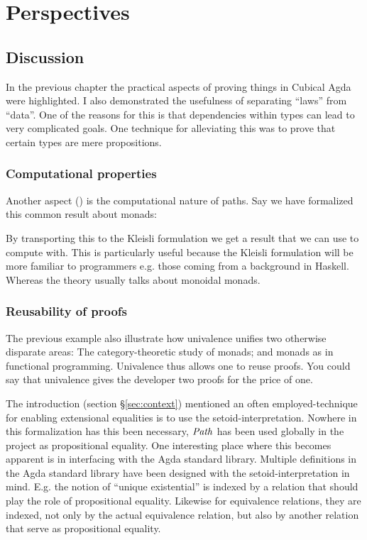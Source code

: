 \chapter{Perspectives}
\section{Discussion}
In the previous chapter the practical aspects of proving things in Cubical Agda
were highlighted. I also demonstrated the usefulness of separating ``laws'' from
``data''. One of the reasons for this is that dependencies within types can lead
to very complicated goals. One technique for alleviating this was to prove that
certain types are mere propositions.

\subsection{Computational properties}
Another aspect () is the computational nature of paths. Say we have formalized this
common result about monads:


By transporting this to the Kleisli formulation we get a result that we can use
to compute with. This is particularly useful because the Kleisli formulation
will be more familiar to programmers e.g. those coming from a background in
Haskell. Whereas the theory usually talks about monoidal monads.


\subsection{Reusability of proofs}
The previous example also illustrate how univalence unifies two otherwise
disparate areas: The category-theoretic study of monads; and monads as in
functional programming. Univalence thus allows one to reuse proofs. You could
say that univalence gives the developer two proofs for the price of one.

The introduction (section \S\ref{sec:context}) mentioned an often
employed-technique for enabling extensional equalities is to use the
setoid-interpretation. Nowhere in this formalization has this been necessary,
$\Path$ has been used globally in the project as propositional equality. One
interesting place where this becomes apparent is in interfacing with the Agda
standard library. Multiple definitions in the Agda standard library have been
designed with the setoid-interpretation in mind. E.g. the notion of ``unique
existential'' is indexed by a relation that should play the role of
propositional equality. Likewise for equivalence relations, they are indexed,
not only by the actual equivalence relation, but also by another relation that
serve as propositional equality.

